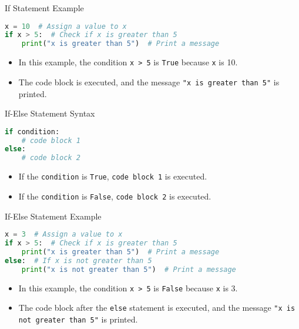 \begin{frame}[fragile]{If Statement Example}
    \begin{lstlisting}[style=colorful, language=Python]
x = 10  # Assign a value to x
if x > 5:  # Check if x is greater than 5
    print("x is greater than 5")  # Print a message
    \end{lstlisting}
    \begin{itemize}
        \item In this example, the condition \texttt{x > 5} is \texttt{True} because \texttt{x} is 10.
        \item The code block is executed, and the message \texttt{"x is greater than 5"} is printed.
    \end{itemize}
\end{frame}

\begin{frame}[fragile]{If-Else Statement Syntax}
    \begin{lstlisting}[style=colorful, language=Python]
if condition:
    # code block 1
else:  
    # code block 2
    \end{lstlisting}
    \begin{itemize}
        \item If the \texttt{condition} is \texttt{True}, \texttt{code block 1} is executed.
        \item If the \texttt{condition} is \texttt{False}, \texttt{code block 2} is executed.
    \end{itemize}
\end{frame}     


\begin{frame}[fragile]{If-Else Statement Example}
    \begin{lstlisting}[style=colorful, language=Python]
x = 3  # Assign a value to x
if x > 5:  # Check if x is greater than 5
    print("x is greater than 5")  # Print a message
else:  # If x is not greater than 5
    print("x is not greater than 5")  # Print a message
    \end{lstlisting}
    \begin{itemize}
        \item In this example, the condition \texttt{x > 5} is \texttt{False} because \texttt{x} is 3.
        \item The code block after the \texttt{else} statement is executed, and the message \texttt{"x is not greater than 5"} is printed.
    \end{itemize}
\end{frame}

